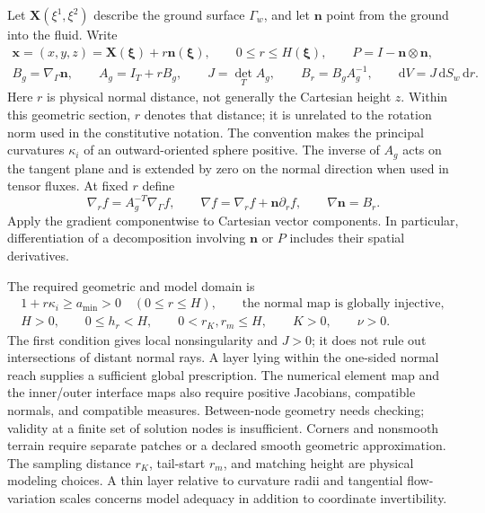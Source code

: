 \documentclass[11pt,a4paper]{article}
\numberwithin{equation}{section}
\newcommand{\dd}{\mathrm d}
\begin{document}
Let $\boldsymbol X(\xi^1,\xi^2)$ describe the ground surface
$\Gamma_w$, and let $\boldsymbol n$ point from the ground into the
fluid.  Write
\begin{equation}
 \begin{gathered}
 \boldsymbol x=(x,y,z)=\boldsymbol X(\boldsymbol\xi)
                    +r\boldsymbol n(\boldsymbol\xi),
 \qquad 0\leq r\leq H(\boldsymbol\xi),\qquad
 P=I-\boldsymbol n\otimes\boldsymbol n,\\
 B_g=\nabla_\Gamma\boldsymbol n,\qquad
 A_g=I_T+rB_g,\qquad J=\det_T A_g,\qquad
 B_r=B_gA_g^{-1},\qquad \dd V=J\,\dd S_w\,\dd r.
 \end{gathered}
 \label{geo:map}
\end{equation}
Here $r$ is physical normal distance, not generally the Cartesian
height $z$.  Within this geometric section, $r$ denotes that distance;
it is unrelated to the rotation norm used in the constitutive
notation.  The convention makes the principal curvatures
$\kappa_i$ of an outward-oriented sphere positive.
The inverse of $A_g$ acts on the tangent plane and is extended by
zero on the normal direction when used in tensor fluxes.  At fixed
$r$ define
\begin{equation}
 \nabla_r f=A_g^{-T}\nabla_\Gamma f,\qquad
 \nabla f=\nabla_r f+\boldsymbol n\partial_r f,
 \qquad \nabla\boldsymbol n=B_r.
 \label{geo:metric-operators}
\end{equation}
Apply the gradient componentwise to Cartesian vector components.
In particular, differentiation of a decomposition involving
$\boldsymbol n$ or $P$ includes their spatial derivatives.

The required geometric and model domain is
\begin{equation}
 \begin{gathered}
 1+r\kappa_i\geq a_{\min}>0\quad (0\leq r\leq H),
 \qquad \text{the normal map is globally injective},\\
 H>0,\qquad 0\leq h_r<H,\qquad 0<r_K,r_m\leq H,
 \qquad K>0,\qquad \nu>0 .
 \end{gathered}
 \label{geo:admissibility}
\end{equation}
The first condition gives local nonsingularity and $J>0$; it does
not rule out intersections of distant normal rays.  A layer lying
within the one-sided normal reach supplies a sufficient global
prescription.  The numerical element map and the inner/outer
interface maps also require positive Jacobians, compatible normals,
and compatible measures.  Between-node geometry needs checking;
validity at a finite set of solution nodes is insufficient.  Corners
and nonsmooth terrain require separate patches or a declared smooth
geometric approximation.  The sampling distance $r_K$, tail-start
$r_m$, and matching height are physical modeling choices.  A thin
layer relative to curvature radii and tangential flow-variation scales
concerns model adequacy in addition to coordinate invertibility.
\end{document}
